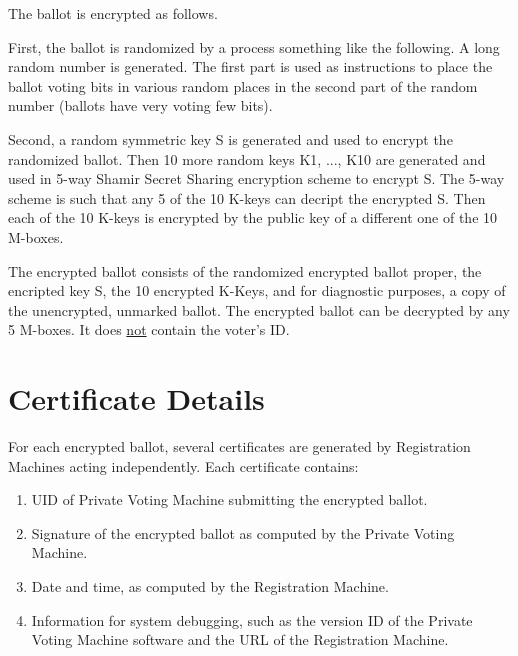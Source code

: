 \documentclass[12pt]{article}
\begin{document}
The ballot is encrypted as follows.

First, the ballot is randomized by a process something like
the following.  A long random number is generated.  The first
part is used as instructions to place the ballot voting bits in
various random places in the second part of the random number
(ballots have very voting few bits).

Second, a random symmetric key S is generated and used to encrypt
the randomized ballot.  Then 10 more random keys K1, ..., K10 are generated
and used in 5-way Shamir Secret Sharing encryption
scheme to encrypt S.  The 5-way
scheme is such that any 5 of the 10 K-keys can decript the encrypted S.
Then each of the 10 K-keys is encrypted by the public key
of a different one of the 10 M-boxes.

The encrypted ballot consists of the randomized encrypted ballot proper,
the encripted key S, the 10 encrypted K-Keys, and for
diagnostic purposes, a copy of the unencrypted, unmarked ballot.  The
encrypted ballot can be decrypted
by any 5 M-boxes.  It does \underline{not} contain the voter's ID.

\section{Certificate Details}

For each encrypted ballot, several certificates are generated
by Registration Machines acting independently.  Each certificate
contains:
\begin{enumerate}
\item UID of Private Voting Machine submitting the encrypted ballot.
\item Signature of the encrypted ballot as computed by the
      Private Voting Machine.
\item Date and time, as computed by the Registration Machine.
\item Information for system debugging, such as the version ID of the
      Private Voting Machine software and the URL of the Registration
      Machine.
\end{enumerate}
\end{document}
